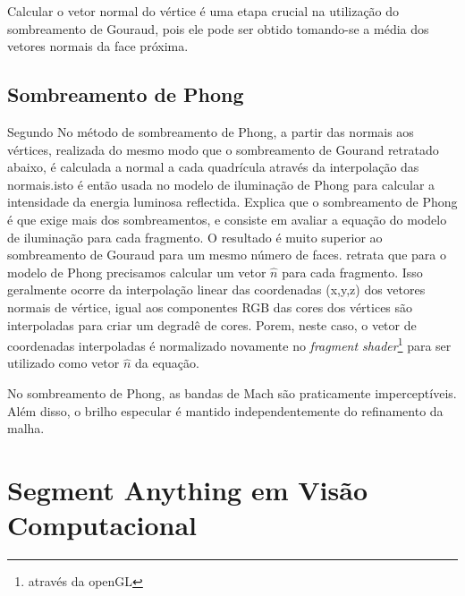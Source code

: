 Calcular o vetor normal do vértice é uma etapa crucial na utilização do sombreamento de Gouraud, pois ele pode ser obtido tomando-se a média dos vetores normais da face próxima.

\subsection{Sombreamento de Phong}

Segundo \cite{Gomes_undated-tr} No método de sombreamento de Phong, a partir das normais aos vértices, realizada do mesmo modo que o sombreamento de Gourand retratado abaixo, é calculada a normal a cada quadrícula através da interpolação das normais.isto é então usada no modelo de iluminação de Phong para calcular a intensidade da energia luminosa reflectida.
 Explica que o sombreamento de Phong é que exige mais dos sombreamentos, e consiste em avaliar a equação do modelo de iluminação para cada fragmento. O resultado é muito superior ao sombreamento de Gouraud para um mesmo número de faces.  retrata que para o modelo de Phong precisamos calcular um vetor \begin{math}\hat{n}\end{math} para cada fragmento. Isso geralmente ocorre da interpolação linear das coordenadas (x,y,z) dos vetores normais de vértice, igual aos componentes RGB das cores dos vértices são interpoladas para criar um degradê de cores. Porem, neste caso, o vetor de coordenadas interpoladas é normalizado novamente no \textit{fragment shader}\footnote{através da openGL} para ser utilizado como vetor \begin{math}\hat{n}\end{math} da equação.

No sombreamento de Phong, as bandas de Mach são praticamente imperceptíveis. Além disso, o brilho especular é mantido independentemente do refinamento da malha.


\section{Segment Anything em Visão Computacional}

